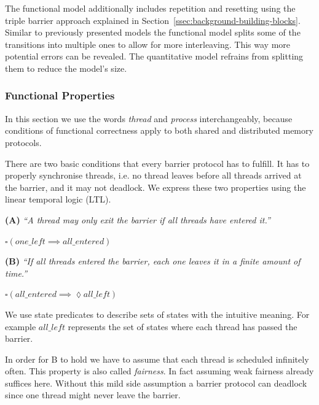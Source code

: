 \documentclass[a4paper, 10pt]{article}
\begin{document}
The functional model additionally includes repetition and resetting using the triple barrier approach explained in Section~\ref{ssec:background-building-blocks}.
Similar to previously presented models the functional model splits some of the transitions into multiple ones to allow for more interleaving. This way more potential errors can be revealed. The quantitative model refrains from splitting them to reduce the model's size.

\subsubsection{Functional Properties}
\label{sssec:analysis-modelchecking-functional-properties}
In this section we use the words \emph{thread} and \emph{process} interchangeably, because conditions of functional correctness apply to both shared and distributed memory protocols.

There are two basic conditions that every barrier protocol has to fulfill.
It has to properly synchronise threads, i.e. no thread leaves before all threads arrived at the barrier, and it may not deadlock.
We express these two properties using the linear temporal logic (LTL).

\vspace{0.2cm}
\noindent \textbf{(A)} \emph{``A thread may only exit the barrier if all threads have entered it.''}
\begin{center}
	$\square ( \mathit{one\_left} \implies \mathit{all\_entered} )$
\end{center}

\vspace{0.2cm}
\noindent \textbf{(B)} \emph{``If all threads entered the barrier, each one leaves it in a finite amount of time.''}
\begin{center}
	$\square ( \mathit{all\_entered} \implies \lozenge \mathit{all\_left} )$
\end{center}

We use state predicates to describe sets of states with the intuitive meaning. For example $\mathit{all\_left}$ represents the set of states where each thread has passed the barrier.

In order for B to hold we have to assume that each thread is scheduled infinitely often. This property is also called \emph{fairness}. In fact assuming weak fairness already suffices here. Without this mild side assumption a barrier protocol can deadlock since one thread might never leave the barrier.
\end{document}
